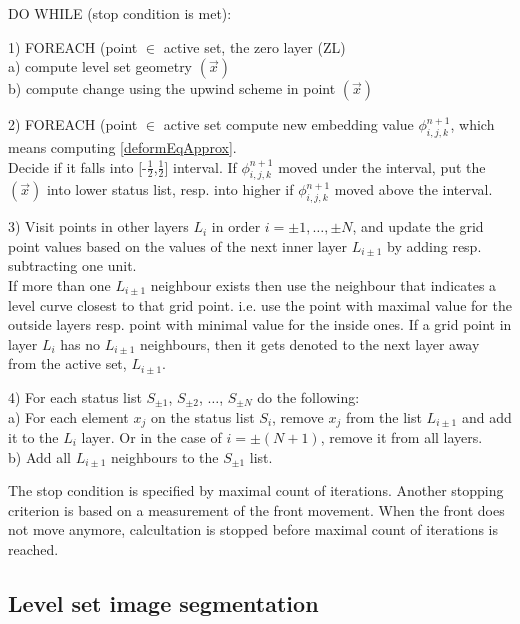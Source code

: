 \par
DO WHILE (stop condition is met):
\par
1) FOREACH (point $\in$ active set, the zero layer (ZL)\\
  a) compute level set geometry $(\vec x)$\\
  b) compute change using the upwind scheme in point $(\vec x)$
\par
2) FOREACH (point $\in$ active set compute new embedding value $\phi_{i,j,k}^{n+1}$, which means computing \ref{deformEqApprox}.\\
Decide if it falls into [-$\frac{1}{2}$,$\frac{1}{2}$] interval.
If $\phi_{i,j,k}^{n+1}$ moved under the interval, put the $(\vec x)$ into lower status list, resp. into higher if $\phi_{i,j,k}^{n+1}$ moved above the interval.
\par
3) Visit points in other layers $L_i$ in order $i=\pm 1,\ldots, \pm N$, and update the grid point values based on the values of the next inner layer $L_{i\pm1}$ by adding resp. subtracting one unit.\\
If more than one $L_{i\pm1}$ neighbour exists then use the neighbour that indicates a level curve closest to that grid point. i.e. use the point with maximal value for the outside layers resp. point with minimal value for the inside ones.
If a grid point in layer $L_i$ has no $L_{i\pm1}$ neighbours, then it gets denoted to the next layer away from the active set, $L_{i\pm1}$.
\par
4) For each status list $S_{\pm1}$, $S_{\pm2}$, $\ldots$, $S_{\pm N}$ do the following:\\
  a) For each element $x_j$ on the status list $S_i$, remove $x_j$ from the list $L_{i\pm1}$ and add it to the $L_{i}$ layer.
Or in the case of $i=\pm (N + 1)$, remove it from all layers.\\
  b) Add all $L_{i\pm1}$ neighbours to the $S_{\pm1}$ list.

\par
The stop condition is specified by maximal count of iterations.
Another stopping criterion is based on a measurement of the front movement.
When the front does not move anymore, calcultation is stopped before maximal count of iterations is reached.

\subsection{Level set image segmentation}

